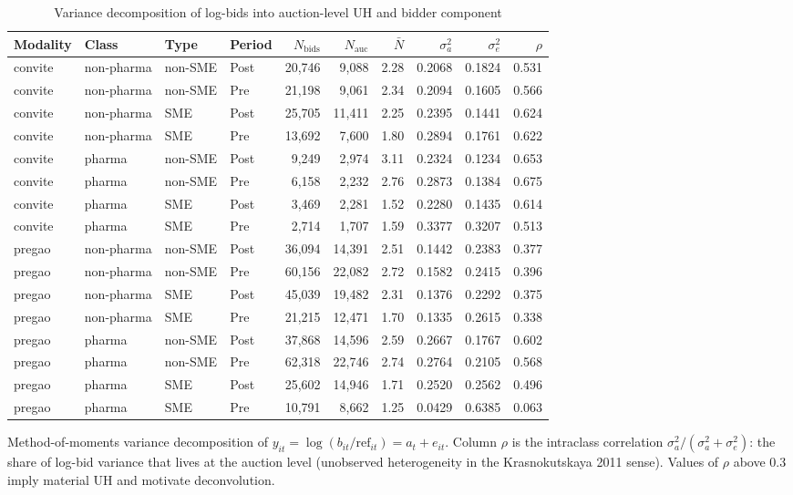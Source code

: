 \begin{table}[htbp]
\centering
\begin{threeparttable}
\caption{Variance decomposition of log-bids into auction-level UH and bidder component}
\label{tab:v3_uh_variance}
\footnotesize
\setlength{\tabcolsep}{3pt}
\begin{tabular}{llllrrrrrr}
\toprule
Modality & Class & Type & Period & $N_{\text{bids}}$ & $N_{\text{auc}}$ & $\bar{N}$ & $\sigma^2_a$ & $\sigma^2_e$ & $\rho$ \\
\midrule
convite & non-pharma & non-SME & Post & 20,746 & 9,088 & 2.28 & 0.2068 & 0.1824 & 0.531 \\
convite & non-pharma & non-SME & Pre & 21,198 & 9,061 & 2.34 & 0.2094 & 0.1605 & 0.566 \\
convite & non-pharma & SME & Post & 25,705 & 11,411 & 2.25 & 0.2395 & 0.1441 & 0.624 \\
convite & non-pharma & SME & Pre & 13,692 & 7,600 & 1.80 & 0.2894 & 0.1761 & 0.622 \\
convite & pharma & non-SME & Post & 9,249 & 2,974 & 3.11 & 0.2324 & 0.1234 & 0.653 \\
convite & pharma & non-SME & Pre & 6,158 & 2,232 & 2.76 & 0.2873 & 0.1384 & 0.675 \\
convite & pharma & SME & Post & 3,469 & 2,281 & 1.52 & 0.2280 & 0.1435 & 0.614 \\
convite & pharma & SME & Pre & 2,714 & 1,707 & 1.59 & 0.3377 & 0.3207 & 0.513 \\
pregao & non-pharma & non-SME & Post & 36,094 & 14,391 & 2.51 & 0.1442 & 0.2383 & 0.377 \\
pregao & non-pharma & non-SME & Pre & 60,156 & 22,082 & 2.72 & 0.1582 & 0.2415 & 0.396 \\
pregao & non-pharma & SME & Post & 45,039 & 19,482 & 2.31 & 0.1376 & 0.2292 & 0.375 \\
pregao & non-pharma & SME & Pre & 21,215 & 12,471 & 1.70 & 0.1335 & 0.2615 & 0.338 \\
pregao & pharma & non-SME & Post & 37,868 & 14,596 & 2.59 & 0.2667 & 0.1767 & 0.602 \\
pregao & pharma & non-SME & Pre & 62,318 & 22,746 & 2.74 & 0.2764 & 0.2105 & 0.568 \\
pregao & pharma & SME & Post & 25,602 & 14,946 & 1.71 & 0.2520 & 0.2562 & 0.496 \\
pregao & pharma & SME & Pre & 10,791 & 8,662 & 1.25 & 0.0429 & 0.6385 & 0.063 \\
\bottomrule
\end{tabular}
\begin{tablenotes}\footnotesize
\item Method-of-moments variance decomposition of $y_{it} =
\log(b_{it}/\text{ref}_{it}) = a_t + e_{it}$. Column $\rho$
is the intraclass correlation $\sigma^2_a / (\sigma^2_a +
\sigma^2_e)$: the share of log-bid variance that lives at the
auction level (unobserved heterogeneity in the Krasnokutskaya
2011 sense). Values of $\rho$ above 0.3 imply material UH and
motivate deconvolution.
\end{tablenotes}
\end{threeparttable}
\end{table}
